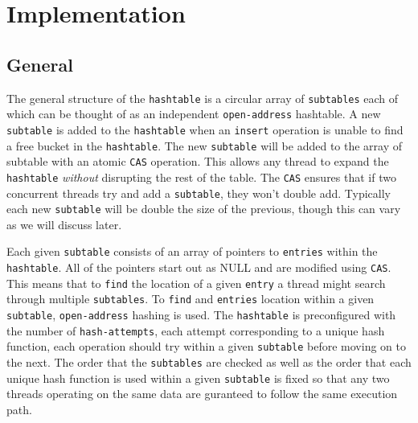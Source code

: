 \section{Implementation}
\subsection{General}
The general structure of the \texttt{hashtable} is a circular array of
\texttt{subtables} each of which can be thought of as an independent
\texttt{open-address} hashtable. A new \texttt{subtable} is added to
the \texttt{hashtable} when an \texttt{insert} operation is unable to
find a free bucket in the \texttt{hashtable}. The new
\texttt{subtable} will be added to the array of subtable with an
atomic \texttt{CAS} operation. This allows any thread to expand the
\texttt{hashtable} \textit{without} disrupting the rest of the
table. The \texttt{CAS} ensures that if two concurrent threads try and
add a \texttt{subtable}, they won't double add. Typically each new
\texttt{subtable} will be double the size of the previous, though this
can vary as we will discuss later.


Each given \texttt{subtable} consists of an array of pointers to
\texttt{entries} within the \texttt{hashtable}. All of the pointers
start out as NULL and are modified using \texttt{CAS}. This means that
to \texttt{find} the location of a given \texttt{entry} a thread might
search through multiple \texttt{subtables}. To \texttt{find} and
\texttt{entries} location within a given \texttt{subtable},
\texttt{open-address} hashing is used. The \texttt{hashtable} is
preconfigured with the number of \texttt{hash-attempts}, each attempt
corresponding to a unique hash function, each operation should try
within a given \texttt{subtable} before moving on to the next. The
order that the \texttt{subtables} are checked as well as the order
that each unique hash function is used within a given
\texttt{subtable} is fixed so that any two threads operating on the
same data are guranteed to follow the same execution path.


